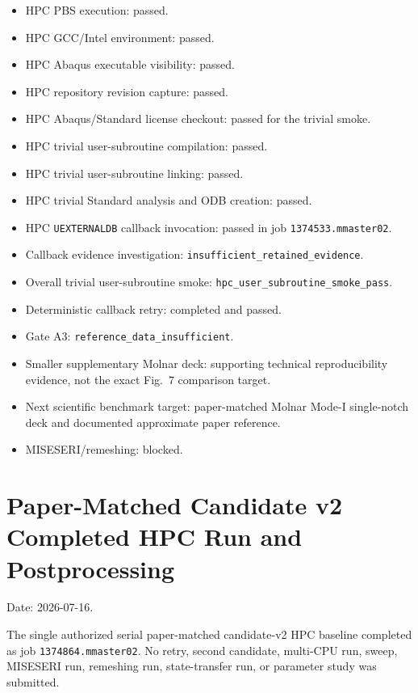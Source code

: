 \documentclass[11pt,a4paper]{article}
\begin{document}
\begin{itemize}
  \item HPC PBS execution: passed.
  \item HPC GCC/Intel environment: passed.
  \item HPC Abaqus executable visibility: passed.
  \item HPC repository revision capture: passed.
  \item HPC Abaqus/Standard license checkout: passed for the trivial smoke.
  \item HPC trivial user-subroutine compilation: passed.
  \item HPC trivial user-subroutine linking: passed.
  \item HPC trivial Standard analysis and ODB creation: passed.
  \item HPC \texttt{UEXTERNALDB} callback invocation: passed in job \texttt{1374533.mmaster02}.
  \item Callback evidence investigation: \texttt{insufficient\_retained\_evidence}.
  \item Overall trivial user-subroutine smoke: \texttt{hpc\_user\_subroutine\_smoke\_pass}.
  \item Deterministic callback retry: completed and passed.
  \item Gate A3: \texttt{reference\_data\_insufficient}.
  \item Smaller supplementary Molnar deck: supporting technical reproducibility evidence, not the exact Fig.~7 comparison target.
  \item Next scientific benchmark target: paper-matched Molnar Mode-I single-notch deck and documented approximate paper reference.
  \item MISESERI/remeshing: blocked.
\end{itemize}

\section{Paper-Matched Candidate v2 Completed HPC Run and Postprocessing}

Date: 2026-07-16.

The single authorized serial paper-matched candidate-v2 HPC baseline completed as job \texttt{1374864.mmaster02}. No retry, second candidate, multi-CPU run, sweep, MISESERI run, remeshing run, state-transfer run, or parameter study was submitted.
\end{document}
